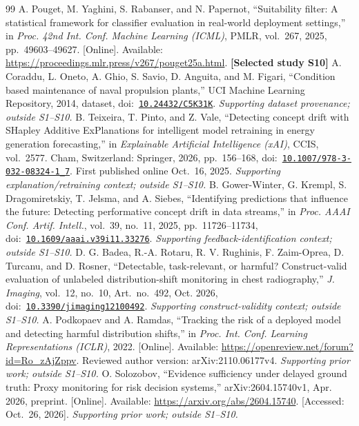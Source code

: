 \documentclass[11pt,a4paper]{article}
\begin{document}
\begin{thebibliography}{99}
 A. Pouget, M. Yaghini, S. Rabanser, and N. Papernot, ``Suitability filter: A statistical framework for classifier evaluation in real-world deployment settings,'' in \emph{Proc. 42nd Int. Conf. Machine Learning (ICML)}, PMLR, vol.~267, 2025, pp.~49603--49627. [Online]. Available: \url{https://proceedings.mlr.press/v267/pouget25a.html}. \textbf{[Selected study S10]}
 A. Coraddu, L. Oneto, A. Ghio, S. Savio, D. Anguita, and M. Figari, ``Condition based maintenance of naval propulsion plants,'' UCI Machine Learning Repository, 2014, dataset, doi:~\href{https://doi.org/10.24432/C5K31K}{\nolinkurl{10.24432/C5K31K}}. \emph{Supporting dataset provenance; outside S1--S10.}
 B. Teixeira, T. Pinto, and Z. Vale, ``Detecting concept drift with SHapley Additive ExPlanations for intelligent model retraining in energy generation forecasting,'' in \emph{Explainable Artificial Intelligence (xAI)}, CCIS, vol.~2577. Cham, Switzerland: Springer, 2026, pp.~156--168, doi:~\href{https://doi.org/10.1007/978-3-032-08324-1_7}{\nolinkurl{10.1007/978-3-032-08324-1_7}}. First published online Oct.~16, 2025. \emph{Supporting explanation/retraining context; outside S1--S10.}
 B. Gower-Winter, G. Krempl, S. Dragomiretskiy, T. Jelsma, and A. Siebes, ``Identifying predictions that influence the future: Detecting performative concept drift in data streams,'' in \emph{Proc. AAAI Conf. Artif. Intell.}, vol.~39, no.~11, 2025, pp.~11726--11734, doi:~\href{https://doi.org/10.1609/aaai.v39i11.33276}{\nolinkurl{10.1609/aaai.v39i11.33276}}. \emph{Supporting feedback-identification context; outside S1--S10.}
 D. G. Badea, R.-A. Rotaru, R. V. Rughinis, F. Zaim-Oprea, D. Turcanu, and D. Rosner, ``Detectable, task-relevant, or harmful? Construct-valid evaluation of unlabeled distribution-shift monitoring in chest radiography,'' \emph{J. Imaging}, vol.~12, no.~10, Art.~no.~492, Oct. 2026, doi:~\href{https://doi.org/10.3390/jimaging12100492}{\nolinkurl{10.3390/jimaging12100492}}. \emph{Supporting construct-validity context; outside S1--S10.}
 A. Podkopaev and A. Ramdas, ``Tracking the risk of a deployed model and detecting harmful distribution shifts,'' in \emph{Proc. Int. Conf. Learning Representations (ICLR)}, 2022. [Online]. Available: \url{https://openreview.net/forum?id=Ro_zAjZppv}. Reviewed author version: arXiv:2110.06177v4. \emph{Supporting prior work; outside S1--S10.}
 O. Solozobov, ``Evidence sufficiency under delayed ground truth: Proxy monitoring for risk decision systems,'' arXiv:2604.15740v1, Apr. 2026, preprint. [Online]. Available: \url{https://arxiv.org/abs/2604.15740}. [Accessed: Oct.~26, 2026]. \emph{Supporting prior work; outside S1--S10.}

\end{thebibliography}
\end{document}
